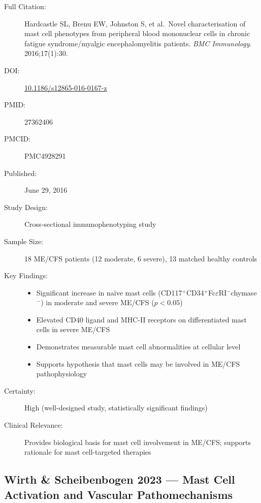 \begin{description}
    \item[Full Citation:] Hardcastle SL, Brenu EW, Johnston S, et al.\ Novel characterisation of mast cell phenotypes from peripheral blood mononuclear cells in chronic fatigue syndrome/myalgic encephalomyelitis patients. \textit{BMC Immunology}. 2016;17(1):30.
    \item[DOI:] \href{https://doi.org/10.1186/s12865-016-0167-z}{10.1186/s12865-016-0167-z}
    \item[PMID:] 27362406
    \item[PMCID:] PMC4928291
    \item[Published:] June 29, 2016
    \item[Study Design:] Cross-sectional immunophenotyping study
    \item[Sample Size:] 18 ME/CFS patients (12 moderate, 6 severe), 13 matched healthy controls
    \item[Key Findings:]
    \begin{itemize}
        \item Significant increase in naïve mast cells (CD117$^+$CD34$^+$Fc$\varepsilon$RI$^-$chymase$^-$) in moderate and severe ME/CFS ($p<0.05$)
        \item Elevated CD40 ligand and MHC-II receptors on differentiated mast cells in severe ME/CFS
        \item Demonstrates measurable mast cell abnormalities at cellular level
        \item Supports hypothesis that mast cells may be involved in ME/CFS pathophysiology
    \end{itemize}
    \item[Certainty:] High (well-designed study, statistically significant findings)
    \item[Clinical Relevance:] Provides biological basis for mast cell involvement in ME/CFS; supports rationale for mast cell-targeted therapies
\end{description}

\subsection{Wirth \& Scheibenbogen 2023 --- Mast Cell Activation and Vascular Pathomechanisms}

